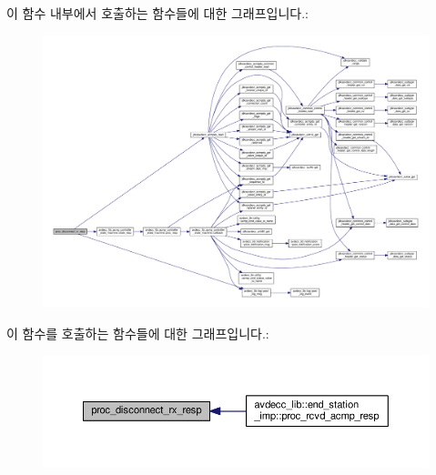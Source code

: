 이 함수 내부에서 호출하는 함수들에 대한 그래프입니다.\+:
\nopagebreak
\begin{figure}[H]
\begin{center}
\leavevmode
\includegraphics[width=350pt]{classavdecc__lib_1_1stream__input__descriptor__imp_ac79268a39683a35aa2b5aacba4ccb9c4_cgraph}
\end{center}
\end{figure}




이 함수를 호출하는 함수들에 대한 그래프입니다.\+:
\nopagebreak
\begin{figure}[H]
\begin{center}
\leavevmode
\includegraphics[width=350pt]{classavdecc__lib_1_1stream__input__descriptor__imp_ac79268a39683a35aa2b5aacba4ccb9c4_icgraph}
\end{center}
\end{figure}


